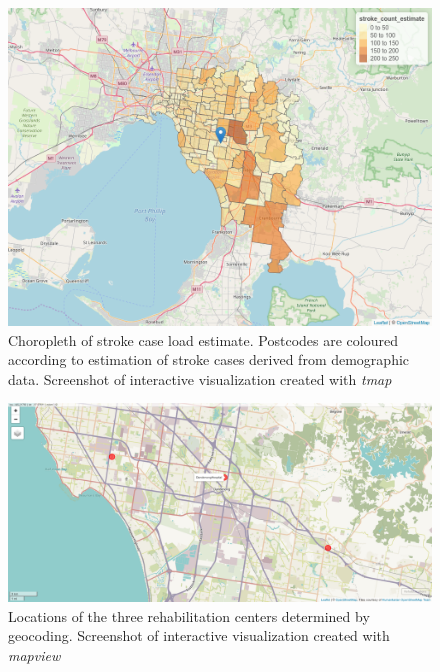 \documentclass[utf8]{frontiersHLTH}
\begin{document}
\begin{figure}[h!]
\begin{center}
\includegraphics[width=14cm]{choropleth.png}
\end{center}
\caption{Choropleth of stroke case load estimate. Postcodes are coloured according to estimation of stroke cases derived from demographic data. Screenshot of interactive visualization created with {\em tmap}}\label{fig:choropleth}
\end{figure}

\begin{figure}[h!]
\begin{center}
\includegraphics[width=15cm]{map1_mv.png}
\end{center}
\caption{Locations of the three rehabilitation centers determined by geocoding. Screenshot of interactive visualization created with {\em mapview}}\label{fig:RehabCenterLocations}
\end{figure}
\end{document}
